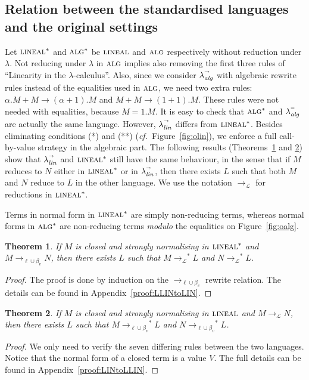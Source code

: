 \documentclass{LMCS}
\newtheorem{theorem}{Theorem}[section]
\newcommand{\App}[1]{The details can be found in Appendix~\ref{proof:#1}}
\newcommand{\olin}{\mbox{\sc lineal}}
\newcommand{\oalg}{\mbox{\sc alg}}
\newcommand{\xllin}[1]{\ensuremath{\lambda^{\raisebox{0.5ex}{\textrm{\tiny $#1$}}}_{{\it lin}}}}
\newcommand{\xlalg}[1]{\ensuremath{\lambda^{\raisebox{0.5ex}{\textrm{\tiny $#1$}}}_{{\it alg}}}}
\newcommand{\llinred}{\xllin{\rightarrow}}
\newcommand{\lalgred}{\xlalg{\rightarrow}}
\newcommand{\lalgeq}{\xlalg{=}}
\newcommand{\xto}[1]{\ensuremath{\rightarrow_{#1}}}
\newcommand{\toolin}{\xto{\mathcal{L}}}
\newcommand{\toblinred}{\xto{\ell\cup\beta_v}}
\newcommand{\stoblinred}{\ensuremath{\xto{\ell\cup\beta_v}^{\ast}}}
\begin{document}
\subsection{Relation between the standardised languages and the original settings}\label{sec:relation-orig}
Let $\olin^*$ and $\oalg^*$ be $\olin$ and $\oalg$ respectively without reduction under $\lambda$. Not reducing under $\lambda$ in $\oalg$ implies also removing the first three rules of ``Linearity in the $\lambda$-calculus''.
Also, since we consider $\lalgred$ with algebraic rewrite rules instead of the equalities used in $\oalg$, we need two extra rules: $\alpha.M + M \to (\alpha+1).M$ and $M+M \to (1+1).M$. These rules were not needed with equalities, because $M = 1.M$.
It is easy to check that $\oalg^*$ and $\lalgeq$ are actually the same language. However, $\llinred$ differs from $\olin^*$. Besides eliminating conditions (*) and (**) ({\em cf.}~Figure~\ref{fig:olin}), we enforce a full call-by-value strategy in the algebraic part. The following results (Theorems~\ref{thm:LLINtoLIN} and \ref{thm:LINtoLLIN}) show that $\llinred$ and $\olin^*$ still have the same behaviour, in the sense that if $M$ reduces to $N$ either in $\olin^*$ or in $\llinred$, then there exists $L$ such that both $M$ and $N$ reduce to $L$ in the other language. We use the notation $\toolin$ for reductions in $\olin^*$.

Terms in normal form in $\olin^*$ are simply non-reducing terms,
whereas normal forms in $\oalg^*$ are non-reducing terms {\em modulo}
the equalities on Figure~\ref{fig:oalg}.

\begin{theorem}
  \label{thm:LLINtoLIN}
  If $M$ is closed and strongly normalising in $\olin^*$ and $M\toblinred N$,
  then there exists $L$ such that $M\toolin^* L$ and $N\toolin^* L$.
\end{theorem}
\begin{proof}
  The proof is done by induction on the $\toblinred$ rewrite relation. \App{LLINtoLIN}.
\end{proof}

\begin{theorem}
  \label{thm:LINtoLLIN}
  If $M$ is closed and strongly normalising in $\olin$ and  $M\toolin N$, then there exists $L$ such that $M\stoblinred L$ and $N\stoblinred L$.
\end{theorem}
\begin{proof}
  We only need to verify the seven differing rules between the two languages.
  Notice that the normal form of a closed term is a value $V$.
  The full details can be found in Appendix~\ref{proof:LINtoLLIN}.
\end{proof}
\end{document}
